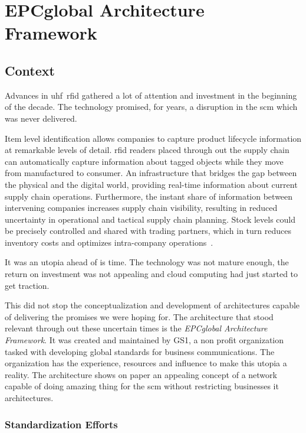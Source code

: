 \chapter{EPCglobal Architecture Framework} \label{sec:epcglobal}

\section{Context}

Advances in \acs{uhf}~\acs{rfid} gathered a lot of attention and investment in the beginning of the decade. The technology promised, for years, a disruption in the \ac{scm} which was never delivered. 

Item level identification allows companies to capture product lifecycle information at remarkable levels of detail. \ac{rfid} readers placed through out the supply chain can automatically capture information about tagged objects while they move from manufactured to consumer.
An infrastructure that bridges the gap between the physical and the digital world, providing real-time information about current supply chain operations.
Furthermore, the instant share of information between intervening companies increases supply chain visibility, resulting in reduced uncertainty in operational and tactical supply chain planning.
Stock levels could be precisely controlled and shared with trading partners, which in turn reduces inventory costs and optimizes intra-company operations~\cite{lorenzDiscoveryServicesEPC2011, simchi-leviCadeiasSuprimentosProjeto2003}.

It was an utopia ahead of is time. The technology was not mature enough, the return on investment was not appealing and cloud computing had just started to get traction.

This did not stop the conceptualization and development of architectures capable of delivering the promises we were hoping for.
The architecture that stood relevant through out these uncertain times is the \emph{EPCglobal Architecture Framework}.
It was created and maintained by GS1, a non profit organization tasked with developing global standards for business communications.
The organization has the experience, resources and influence to make this utopia a reality.
The architecture shows on paper an appealing concept of a network capable of doing amazing thing for the \ac{scm} without restricting businesses \ac{it} architectures.

\subsection{Standardization Efforts}

